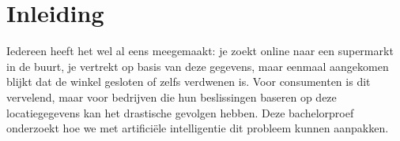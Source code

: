 \section{Inleiding}%
\label{sec:inleiding}






Iedereen heeft het wel al eens meegemaakt: je zoekt online naar een supermarkt in de buurt, je vertrekt op basis van deze gegevens, 
maar eenmaal aangekomen blijkt dat de winkel gesloten of zelfs verdwenen is. 
Voor consumenten is dit vervelend, maar voor bedrijven die hun beslissingen baseren op deze locatiegegevens kan het drastische gevolgen 
hebben. Deze bachelorproef onderzoekt hoe we met artificiële intelligentie dit probleem kunnen aanpakken.

